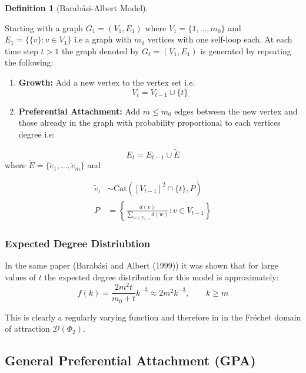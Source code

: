 \documentclass[
  10pt,
  a4paper,
]{scrreprt}
\providecommand{\tightlist}{%
  \setlength{\itemsep}{0pt}\setlength{\parskip}{0pt}}\usepackage{longtable,booktabs,array}
\theoremstyle{plain}
\theoremstyle{definition}
\newtheorem{definition}{Definition}[section]
\theoremstyle{remark}
\begin{document}
{\begin{definition}[Barabási-Albert
Model]\protect\hypertarget{def-ba}{}\label{def-ba}

Starting with a graph \(G_1 = (V_1, E_1)\) where
\(V_1 = \{1,\ldots,m_0\}\) and \(E_1 = \{\{v\}:v\in V_1\}\) i.e a graph
with \(m_0\) vertices with one self-loop each. At each time step \(t>1\)
the graph denoted by \(G_t = (V_1, E_1)\) is generated by repeating the
following:

\begin{enumerate}
\def\labelenumi{\arabic{enumi}.}
\tightlist
\item
  \textbf{Growth:} Add a new vertex to the vertex set i.e. \[
  V_t = V_{t-1} \cup \{t\}
  \]
\item
  \textbf{Preferential Attachment:} Add \(m\le m_0\) edges between the
  new vertex and those already in the graph with probability
  proportional to each vertices degree i.e:
\end{enumerate}

\[
E_t= E_{t-1} \cup \tilde E
\] where \(\tilde E = \{\tilde e_1,\ldots, \tilde e_m\}\) and

\begin{align*}
\tilde e_i &\sim \text{Cat}\left([V_{t-1}]^2 \cap \{t\},P \right)\\
P &= \left\{\frac{d(v)}{\sum_{w\in V_{t-1}} d(w)} : v \in V_{t-1}\right\}
\end{align*}

\end{definition}

\hypertarget{expected-degree-distriubtion}{%
\subsubsection{Expected Degree
Distriubtion}\label{expected-degree-distriubtion}}

In the same paper (Barabási and Albert (1999)) it was shown that for
large values of \(t\) the expected degree distribution for this model is
approximately: \[
f(k) = \frac{2m^2t}{m_0+t}k^{-3} \approx 2m^2k^{-3},\qquad k\ge m
\]

This is clearly a regularly varying function and therefore in in the
Fréchet domain of attraction \(\mathcal D(\Phi_2)\).

\hypertarget{general-preferential-attachment-gpa}{%
\subsection{General Preferential Attachment
(GPA)}\label{general-preferential-attachment-gpa}}

}
\end{document}

